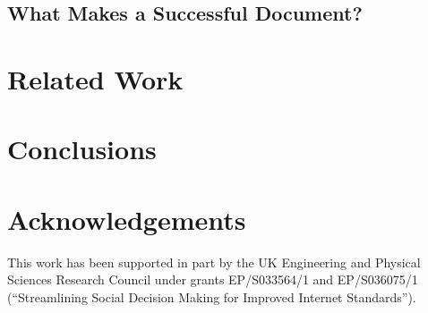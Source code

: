 \documentclass[twocolumn,10pt]{article}
\begin{document}
\subsection{What Makes a Successful Document?}


\section{Related Work}
\label{sec:related}

%
%



\section{Conclusions}
\label{sec:conclusions}


\section*{Acknowledgements}


This work has been supported in part by the UK Engineering and Physical
Sciences Research Council under grants EP/S033564/1 and EP/S036075/1
(``Streamlining Social Decision Making for Improved Internet Standards'').
\end{document}
